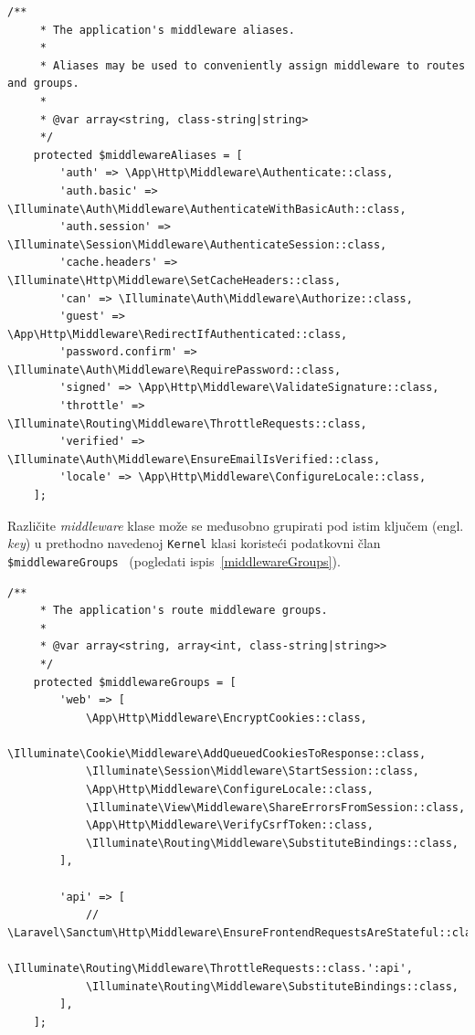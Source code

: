 \begin{lstlisting}[caption={Definiranje \textit{middleware} \textit{aliasa}}, label=middlewareAliases]
    /**
     * The application's middleware aliases.
     *
     * Aliases may be used to conveniently assign middleware to routes and groups.
     *
     * @var array<string, class-string|string>
     */
    protected $middlewareAliases = [
        'auth' => \App\Http\Middleware\Authenticate::class,
        'auth.basic' => \Illuminate\Auth\Middleware\AuthenticateWithBasicAuth::class,
        'auth.session' => \Illuminate\Session\Middleware\AuthenticateSession::class,
        'cache.headers' => \Illuminate\Http\Middleware\SetCacheHeaders::class,
        'can' => \Illuminate\Auth\Middleware\Authorize::class,
        'guest' => \App\Http\Middleware\RedirectIfAuthenticated::class,
        'password.confirm' => \Illuminate\Auth\Middleware\RequirePassword::class,
        'signed' => \App\Http\Middleware\ValidateSignature::class,
        'throttle' => \Illuminate\Routing\Middleware\ThrottleRequests::class,
        'verified' => \Illuminate\Auth\Middleware\EnsureEmailIsVerified::class,
        'locale' => \App\Http\Middleware\ConfigureLocale::class,
    ];
\end{lstlisting}

Različite \textit{middleware} klase može se međusobno grupirati pod istim ključem (engl. \textit{key}) u prethodno navedenoj \texttt{Kernel} klasi  koristeći podatkovni član \texttt{\$middlewareGroups}~\cite{middleware} (pogledati ispis~\ref{middlewareGroups}).

\begin{lstlisting}[caption={Definiranje \textit{middleware} grupa}, label=middlewareGroups]
    /**
     * The application's route middleware groups.
     *
     * @var array<string, array<int, class-string|string>>
     */
    protected $middlewareGroups = [
        'web' => [
            \App\Http\Middleware\EncryptCookies::class,
            \Illuminate\Cookie\Middleware\AddQueuedCookiesToResponse::class,
            \Illuminate\Session\Middleware\StartSession::class,
            \App\Http\Middleware\ConfigureLocale::class,
            \Illuminate\View\Middleware\ShareErrorsFromSession::class,
            \App\Http\Middleware\VerifyCsrfToken::class,
            \Illuminate\Routing\Middleware\SubstituteBindings::class,
        ],

        'api' => [
            // \Laravel\Sanctum\Http\Middleware\EnsureFrontendRequestsAreStateful::class,
            \Illuminate\Routing\Middleware\ThrottleRequests::class.':api',
            \Illuminate\Routing\Middleware\SubstituteBindings::class,
        ],
    ];
\end{lstlisting}

